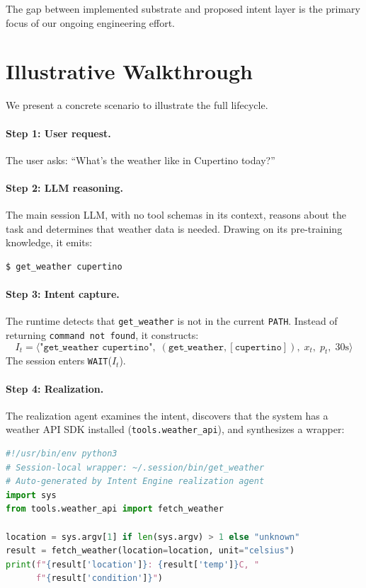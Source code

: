 \documentclass[11pt]{article}
\begin{document}
The gap between implemented substrate and proposed intent layer is the primary focus of our ongoing engineering effort.

\section{Illustrative Walkthrough}
\label{sec:example}

We present a concrete scenario to illustrate the full lifecycle.

\paragraph{Step 1: User request.}
The user asks: ``What's the weather like in Cupertino today?''

\paragraph{Step 2: LLM reasoning.}
The main session LLM, with no tool schemas in its context, reasons about the task and determines that weather data is needed. Drawing on its pre-training knowledge, it emits:

\begin{lstlisting}
$ get_weather cupertino
\end{lstlisting}

\paragraph{Step 3: Intent capture.}
The runtime detects that \texttt{get\_weather} is not in the current \texttt{PATH}. Instead of returning \texttt{command not found}, it constructs:
\[
I_t = \langle \texttt{"get\_weather cupertino"},\; (\texttt{get\_weather}, [\texttt{cupertino}]),\; x_t,\; p_t,\; 30\text{s} \rangle
\]
The session enters \texttt{WAIT}($I_t$).

\paragraph{Step 4: Realization.}
The realization agent examines the intent, discovers that the system has a weather API SDK installed (\texttt{tools.weather\_api}), and synthesizes a wrapper:

\begin{lstlisting}[language=Python]
#!/usr/bin/env python3
# Session-local wrapper: ~/.session/bin/get_weather
# Auto-generated by Intent Engine realization agent
import sys
from tools.weather_api import fetch_weather

location = sys.argv[1] if len(sys.argv) > 1 else "unknown"
result = fetch_weather(location=location, unit="celsius")
print(f"{result['location']}: {result['temp']}C, "
      f"{result['condition']}")
\end{lstlisting}
\end{document}
